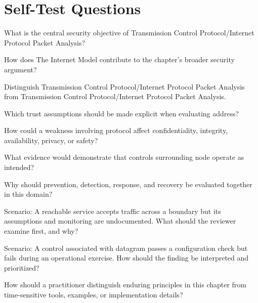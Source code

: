 \documentclass[11pt,letterpaper]{article}
\begin{document}
\section*{Self-Test Questions}
\begin{CornellRecallList}
\item What is the central security objective of Transmission Control Protocol/Internet Protocol Packet Analysis?
\item How does The Internet Model contribute to the chapter's broader security argument?
\item Distinguish Transmission Control Protocol/Internet Protocol Packet Analysis from Transmission Control Protocol/Internet Protocol Packet Analysis.
\item Which trust assumptions should be made explicit when evaluating address?
\item How could a weakness involving protocol affect confidentiality, integrity, availability, privacy, or safety?
\item What evidence would demonstrate that controls surrounding node operate as intended?
\item Why should prevention, detection, response, and recovery be evaluated together in this domain?
\item Scenario: A reachable service accepts traffic across a boundary but its assumptions and monitoring are undocumented. What should the reviewer examine first, and why?
\item Scenario: A control associated with datagram passes a configuration check but fails during an operational exercise. How should the finding be interpreted and prioritized?
\item How should a practitioner distinguish enduring principles in this chapter from time-sensitive tools, examples, or implementation details?
\end{CornellRecallList}
\end{document}
